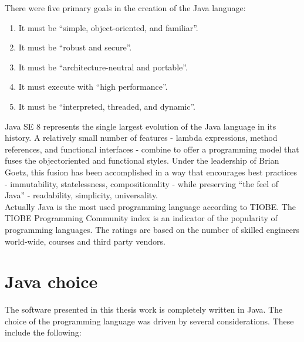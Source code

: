 There were five primary goals in the creation of the Java language:\cite{java}
\begin{enumerate}
\item It must be ``simple, object-oriented, and familiar''.
\item It must be ``robust and secure''.
\item It must be ``architecture-neutral and portable''.
\item It must execute with ``high performance''.
\item It must be ``interpreted, threaded, and dynamic''.
\end{enumerate}
Java SE 8 represents the single largest evolution of the Java language in its history. A relatively small number of features - lambda expressions, method references, and functional interfaces - combine to offer a programming model that fuses the objectoriented
and functional styles. Under the leadership of Brian Goetz, this fusion has been accomplished in a way that encourages best practices - immutability, statelessness, compositionality - while preserving ``the feel of Java'' - readability, simplicity, universality.\\
Actually Java is the most used programming language according to TIOBE. The TIOBE Programming Community index is an indicator of the popularity of programming languages. The ratings are based on the number of skilled engineers world-wide, courses and third party vendors.


\section{Java choice}

The software presented in this thesis work is completely written in Java. The choice of the programming language was driven by several considerations. These include the following:

